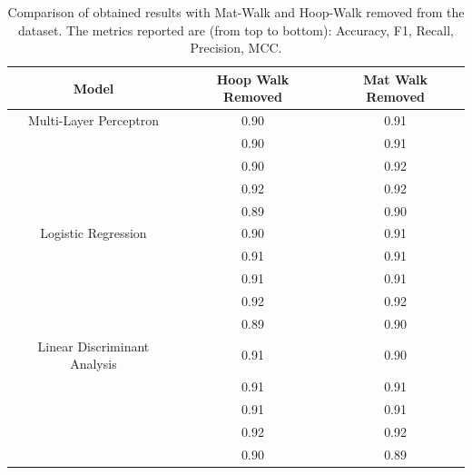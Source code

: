             \begin{table}[htbp]
                \centering
                \caption{Comparison of obtained results with Mat-Walk and Hoop-Walk removed from the dataset. The metrics reported are (from top to bottom): Accuracy, F1, Recall, Precision, MCC.}
                \label{tab:feature_engineering_approach_mat_hoop}
                \begin{tabular}{|c|c|c|}
                \hline
                \textbf{Model} & \textbf{Hoop Walk Removed} & \textbf{Mat Walk Removed} \\ \hline
                    Multi-Layer Perceptron          & 0.90 & 0.91 \\ 
                                                    & 0.90 & 0.91 \\ 
                                                    & 0.90 & 0.92 \\
                                                    & 0.92 & 0.92 \\ 
                                                    & 0.89 & 0.90 \\
                                                    \hline
                    Logistic Regression             & 0.90 & 0.91 \\ 
                                                    & 0.91 & 0.91 \\ 
                                                    & 0.91 & 0.91 \\ 
                                                    & 0.92 & 0.92 \\
                                                    & 0.89 & 0.90 \\
                                                    \hline
                    Linear Discriminant Analysis    & 0.91 & 0.90 \\ 
                                                    & 0.91 & 0.91 \\ 
                                                    & 0.91 & 0.91 \\ 
                                                    & 0.92 & 0.92 \\
                                                    & 0.90 & 0.89 \\ 
                                                    \hline
                \end{tabular}
            \end{table}

